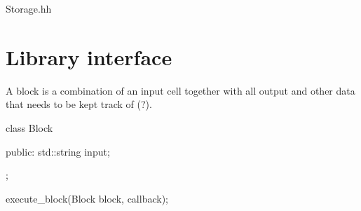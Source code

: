 

Storage.hh



\section{Library interface}

A block is a combination of an input cell together with all output and
other data that needs to be kept track of (?). 

class Block {
   public: 
      std::string input;
      
};

execute_block(Block block, callback);
